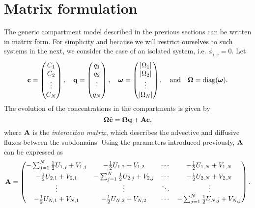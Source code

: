 \section{Matrix formulation}
The generic compartment model described in the previous sections can be written in matrix form. For simplicity and because we will restrict ourselves to such systems in the next, we consider the case of an isolated system, i.e. $\phi_{i,e} = 0$. Let
\begin{equation} \label{eq:def_compartment_vars}
	\mathbf c = \begin{pmatrix} C_1 \\ C_2 \\ \vdots \\ C_N \end{pmatrix}, \quad \mathbf q = \begin{pmatrix} q_1 \\ q_2 \\ \vdots \\ q_N \end{pmatrix}, \quad \boldsymbol \omega = \begin{pmatrix} |\Omega_1| \\ |\Omega_2| \\ \vdots \\ |\Omega_N| \end{pmatrix}, \quad \mbox{and} \quad \boldsymbol \Omega = \operatorname{diag}(\boldsymbol \omega).
\end{equation}
The evolution of the concentrations in the compartments is given by
\begin{equation} \label{eq:compartmentmatrix}
	\boldsymbol \Omega \mathbf{\dot{c}} = \boldsymbol \Omega \mathbf q + \mathbf A \mathbf c,
\end{equation}
where $\mathbf A$ is the \textit{interaction matrix}, which describes the advective and diffusive fluxes between the subdomains. Using the parameters introduced previously, $\mathbf A$ can be expressed as
\begin{equation} \label{eq:generalA}
	\mathbf A = 	\begin{pmatrix}
				-\sum_{j=1}^N \frac{1}{2}U_{1,j}+V_{1,j} & -\frac{1}{2}U_{1,2}+V_{1,2} & \cdots & -\frac{1}{2}U_{1,N}+V_{1,N}\\[.1cm]
				-\frac{1}{2}U_{2,1}+V_{2,1} & -\sum_{j=1}^N \frac{1}{2}U_{2,j}+V_{2,j} & \cdots & -\frac{1}{2}U_{2,N}+V_{2,N}\\
				\vdots & \vdots & \ddots & \vdots\\
				-\frac{1}{2}U_{N,1}+V_{N,1} & -\frac{1}{2}U_{N,2}+V_{N,2} & \cdots & -\sum_{j=1}^N \frac{1}{2}U_{N,j}+V_{N,j}
			\end{pmatrix}.
\end{equation}
